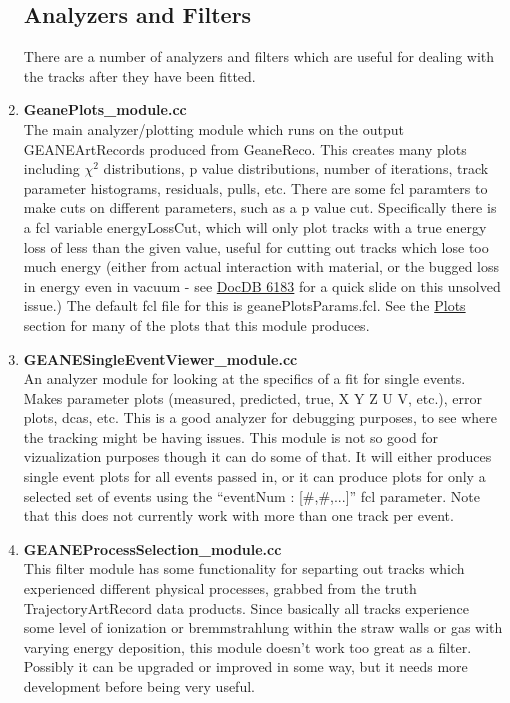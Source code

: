 \begin{enumerate}
  \subsection{Analyzers and Filters}
  \label{sec:AnaFilt}

  There are a number of analyzers and filters which are useful for dealing with the tracks after they have been fitted.

      \item{\bf{GeanePlots\_module.cc}} \\
      The main analyzer/plotting module which runs on the output GEANEArtRecords produced from GeaneReco. This creates many plots including $\chi^{2}$ distributions, p value distributions, number of iterations, track parameter histograms, residuals, pulls, etc. There are some fcl paramters to make cuts on different parameters, such as a p value cut. Specifically there is a fcl variable energyLossCut, which will only plot tracks with a true energy loss of less than the given value, useful for cutting out tracks which lose too much energy (either from actual interaction with material, or the bugged loss in energy even in vacuum - see \href{https://gm2-docdb.fnal.gov/cgi-bin/private/ShowDocument?docid=6183}{DocDB 6183} for a quick slide on this unsolved issue.) The default fcl file for this is geanePlotsParams.fcl. See the \hyperref[sec:Plots]{Plots} section for many of the plots that this module produces.

      \item{\bf{GEANESingleEventViewer\_module.cc}} \\
      An analyzer module for looking at the specifics of a fit for single events. Makes parameter plots (measured, predicted, true, X Y Z U V, etc.), error plots, dcas, etc. This is a good analyzer for debugging purposes, to see where the tracking might be having issues. This module is not so good for vizualization purposes though it can do some of that. It will either produces single event plots for all events passed in, or it can produce plots for only a selected set of events using the ``eventNum : [\#,\#,...]'' fcl parameter. Note that this does not currently work with more than one track per event.

      \item{\bf{GEANEProcessSelection\_module.cc}} \\
      This filter module has some functionality for separting out tracks which experienced different physical processes, grabbed from the truth TrajectoryArtRecord data products. Since basically all tracks experience some level of ionization or bremmstrahlung within the straw walls or gas with varying energy deposition, this module doesn't work too great as a filter. Possibly it can be upgraded or improved in some way, but it needs more development before being very useful.


\end{enumerate}
